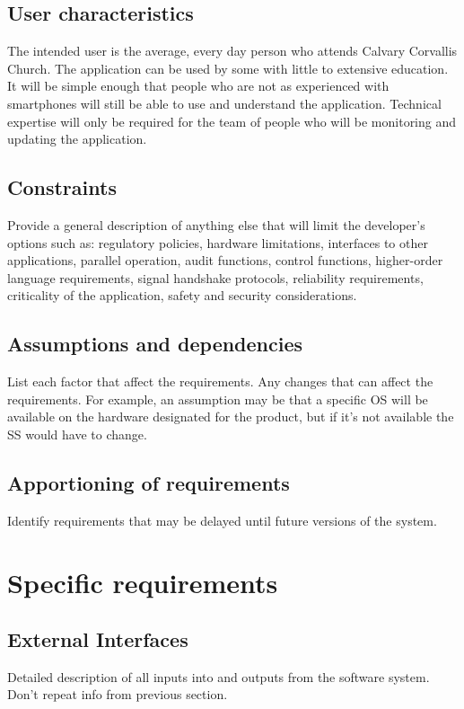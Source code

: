 \documentclass[letterpaper,10pt,draftclsnofoot,onecolumn,titlepage]{IEEEtran}
\begin{document}
	\subsection{User characteristics}
	The intended user is the average, every day person who attends Calvary Corvallis Church.
	The application can be used by some with little to extensive education.
	It will be simple enough that people who are not as experienced with smartphones will still be able to use and understand the application.
	Technical expertise will only be required for the team of people who will be monitoring and updating the application.

	\subsection{Constraints}
	Provide a general description of anything else that will limit the developer's options such as: regulatory policies, hardware limitations, interfaces to other applications, parallel operation, audit functions, control functions, higher-order language requirements, signal handshake protocols, reliability requirements, criticality of the application, safety and security considerations.

	\subsection{Assumptions and dependencies}
	List each factor that affect the requirements.
	Any changes that can affect the requirements.
	For example, an assumption may be that a specific OS will be available on the hardware designated for the product, but if it's not available the SS would have to change.

	\subsection{Apportioning of requirements}
	Identify requirements that may be delayed until future versions of the system.

	\section{Specific requirements}
	\subsection{External Interfaces}
	Detailed description of all inputs into and outputs from the software system. Don't repeat info from previous section.
\end{document}
